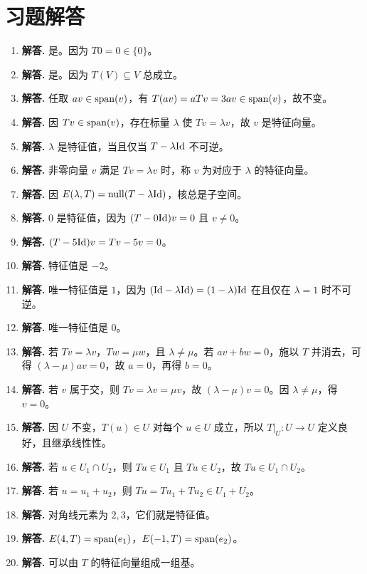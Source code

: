 \section*{习题解答}
\begin{enumerate}[label=\textbf{\arabic*.}, leftmargin=*, itemsep=1em]
\item \textbf{解答.} 是。因为 $T0=0\in\{0\}$。
\item \textbf{解答.} 是。因为 $T(V)\subseteq V$ 总成立。
\item \textbf{解答.} 任取 $av\in\operatorname{span}(v)$，有 $T(av)=aTv=3av\in\operatorname{span}(v)$，故不变。
\item \textbf{解答.} 因 $Tv\in\operatorname{span}(v)$，存在标量 $\lambda$ 使 $Tv=\lambda v$，故 $v$ 是特征向量。
\item \textbf{解答.} $\lambda$ 是特征值，当且仅当 $T-\lambda\mathrm{Id}$ 不可逆。
\item \textbf{解答.} 非零向量 $v$ 满足 $Tv=\lambda v$ 时，称 $v$ 为对应于 $\lambda$ 的特征向量。
\item \textbf{解答.} 因 $E(\lambda,T)=\mathrm{null}(T-\lambda\mathrm{Id})$，核总是子空间。
\item \textbf{解答.} $0$ 是特征值，因为 $(T-0\mathrm{Id})v=0$ 且 $v\neq 0$。
\item \textbf{解答.} $(T-5\mathrm{Id})v=Tv-5v=0$。
\item \textbf{解答.} 特征值是 $-2$。
\item \textbf{解答.} 唯一特征值是 $1$，因为 $(\mathrm{Id}-\lambda\mathrm{Id})=(1-\lambda)\mathrm{Id}$ 在且仅在 $\lambda=1$ 时不可逆。
\item \textbf{解答.} 唯一特征值是 $0$。
\item \textbf{解答.} 若 $Tv=\lambda v$，$Tw=\mu w$，且 $\lambda\neq\mu$。若 $av+bw=0$，施以 $T$ 并消去，可得 $(\lambda-\mu)av=0$，故 $a=0$，再得 $b=0$。
\item \textbf{解答.} 若 $v$ 属于交，则 $Tv=\lambda v=\mu v$，故 $(\lambda-\mu)v=0$。因 $\lambda\neq\mu$，得 $v=0$。
\item \textbf{解答.} 因 $U$ 不变，$T(u)\in U$ 对每个 $u\in U$ 成立，所以 $T|_U:U\to U$ 定义良好，且继承线性性。
\item \textbf{解答.} 若 $u\in U_1\cap U_2$，则 $Tu\in U_1$ 且 $Tu\in U_2$，故 $Tu\in U_1\cap U_2$。
\item \textbf{解答.} 若 $u=u_1+u_2$，则 $Tu=Tu_1+Tu_2\in U_1+U_2$。
\item \textbf{解答.} 对角线元素为 $2,3$，它们就是特征值。
\item \textbf{解答.} $E(4,T)=\operatorname{span}(e_1)$，$E(-1,T)=\operatorname{span}(e_2)$。
\item \textbf{解答.} 可以由 $T$ 的特征向量组成一组基。

\end{enumerate}
